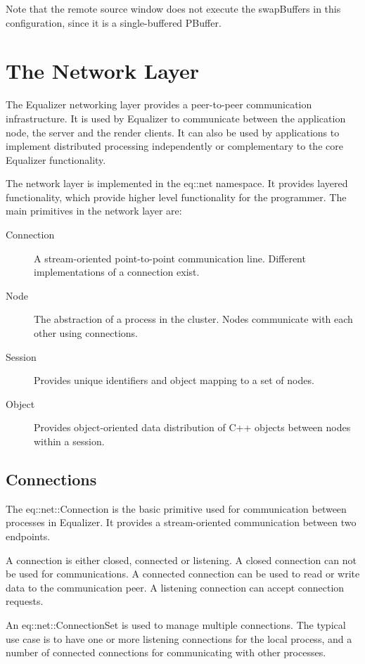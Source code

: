 \documentclass[10pt,a4]{scrartcl}
\begin{document}
Note that the remote source window does not execute the swapBuffers in
this configuration, since it is a single-buffered PBuffer.



\section{\label{sNetwork}The Network Layer}

The Equalizer networking layer provides a peer-to-peer communication
infrastructure. It is used by Equalizer to communicate between the
application node, the server and the render clients. It can also be
used by applications to implement distributed processing independently
or complementary to the core Equalizer functionality.

The network layer is implemented in the \textsf{eq::net} namespace. It
provides layered functionality, which provide higher level functionality
for the programmer. The main primitives in the network layer are:

\begin{description}
\item[Connection] A stream-oriented point-to-point communication
  line. Different implementations of a connection exist.
\item[Node] The abstraction of a process in the cluster. Nodes
  communicate with each other using connections.
\item[Session] Provides unique identifiers and object mapping to a set
  of nodes.
\item[Object] Provides object-oriented data distribution of C++ objects
  between nodes within a session.
\end{description}

\subsection{Connections}

The \textsf{eq::net::Connection} is the basic primitive used for
communication between processes in Equalizer. It provides a
stream-oriented communication between two endpoints.

A connection is either closed, connected or listening. A closed
connection can not be used for communications. A connected connection
can be used to read or write data to the communication peer. A listening
connection can accept connection requests.

An \textsf{eq::net::ConnectionSet} is used to manage multiple
connections. The typical use case is to have one or more listening
connections for the local process, and a number of connected connections
for communicating with other processes.
\end{document}
